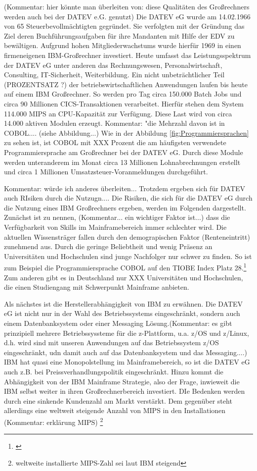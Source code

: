 (Kommentar: hier könnte man überleiten von: diese Qualitäten des Großrechners werden auch bei der DATEV e.G. genutzt)
Die DATEV eG wurde am 14.02.1966 von 65 Steuerbevollmächtigten gegründet.
Sie verfolgten mit der Gründung das Ziel deren Buchführungsaufgaben für ihre Mandanten mit Hilfe der EDV zu bewältigen.
Aufgrund hohen Mitgliederwachstums wurde hierfür 1969 in einen firmeneigenen IBM-Großrechner investiert.\cite{DATEVeG.2017}
Heute umfasst das Leistungsspektrum der DATEV eG unter anderen das Rechnungswesen, Personalwirtschaft, Consulting, IT-Sicherheit, Weiterbildung.
Ein nicht unbeträchtlicher Teil (PROZENTSATZ ?) der betriebswirtschaftlichen Anwendungen laufen bis heute auf einem IBM Großrechner.
So werden pro Tag circa 150.000 Batch Jobs und circa 90 Millionen CICS-Transaktionen verarbeitet.
Hierfür stehen dem System 114.000 MIPS an CPU-Kapazität zur Verfügung.
Diese Last wird von circa 14.000 aktiven Modulen erzeugt.
Kommentar: "die Mehrzahl davon ist in COBOL.... (siehe Abbildung...)
Wie in der Abbildung \ref{fig:Programmiersprachen} zu sehen ist, ist COBOL mit XXX Prozent die am häufigsten verwendete Programmiersprache am Großrechner bei der DATEV eG.
Durch diese Module werden unteranderem im Monat circa 13 Millionen Lohnabrechnungen erstellt und circa 1 Millionen Umsatzsteuer-Voranmeldungen durchgeführt.

Kommentar: würde ich anderes überleiten... Trotzdem ergeben sich für DATEV auch RIsiken durch die Nutzugn....
Die Risiken, die sich für die DATEV eG durch die Nutzung eines IBM Großrechners ergeben, werden im Folgenden dargestellt.\\
Zunächst ist zu nennen, (Kommentar... ein wichtiger Faktor ist...) dass die Verfügbarkeit von Skills im Mainframebereich immer schlechter wird.
Die aktuellen Wissensträger fallen durch den demograpischen Faktor (Renteneintritt)  zunehmend aus.
Durch die geringe Beliebtheit und wenig Präsenz an Universitäten und Hochschulen sind junge Nachfolger nur schwer zu finden.
So ist zum Beispiel die Programmiersprache COBOL auf den TIOBE Index Platz 28.\footnote{\cite{TIOBESoftwareBV.25.11.2019}}
Zum anderen gibt es in Deutschland nur XXX Universitäten und Hochschulen, die einen Studiengang mit Schwerpunkt Mainframe anbieten.\cite{fehlt noch}

Als nächstes ist die Herstellerabhängigkeit von IBM zu erwähnen.
Die DATEV eG ist nicht nur in der Wahl des Betriebssystems eingeschränkt, sondern auch einem Datenbanksystem oder einer Messaging Lösung.(Kommentar: es gibt prinzipiell mehrere Betriebssyssteme für die z-Plattform, u.a. z/OS und z/Linux, d.h. wird sind mit unseren Anwendungen auf das Betriebssystem z/OS eingeschränkt, udn damit auch auf das Datenbanksystem und das Messaging....)
IBM hat  quasi eine Monopolstellung\cite{fehlt noch} im Mainframebereich, so ist die DATEV eG auch z.B. bei Preissverhandlungspolitik eingeschränkt.
Hinzu kommt die Abhängigkeit von der IBM Mainframe Strategie, also der Frage, inwieweit die IBM selbst weiter in ihren Großrechnerbereich investiert.
DIe Bedenken werden durch eine sinkende Kundenzahl am Markt verstärkt. Dem gegenüber steht allerdings eine weltweit steigende Anzahl von MIPS in den Installationen (Kommentar: erklärung MIPS) \footnote{weltweite installierte MIPS-Zahl sei laut IBM steigend}

